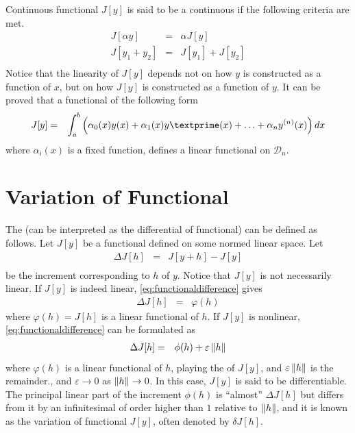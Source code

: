 Continuous functional $J[y]$ is said to be a continuous  if the following criteria are met.
\begin{eqnarray}
  J[\alpha y] &=& \alpha J[y] \nonumber \\
  J[y_1 + y_2] &=& J[y_1] + J[y_2] \nonumber \\
\end{eqnarray}
Notice that the linearity of $J[y]$ depends not on how $y$ is constructed as a function of $x$, but on how $J[y]$ is constructed as a function of $y$. It can be proved that a functional of the following form
\begin{eqnarray}
  J[y] &=& \int_{a}^{b}\left(\alpha_0(x)y(x) + \alpha_1(x)y\textprime(x) + \ldots + \alpha_n y^{(n)}(x)\right)dx
\end{eqnarray}
where $\alpha_i(x)$ is a fixed function, defines a linear functional on $\mathcal{D}_n$. 
 
\section{Variation of Functional}

The  (can be interpreted as the differential of functional) can be defined as follows. Let $J[y]$ be a functional defined on some normed linear space. Let
\begin{eqnarray}
\Delta J[h] &=& J[y + h] - J[y] \label{eq:functionaldifference} \\
\end{eqnarray}
be the increment corresponding to $h$ of $y$. Notice that $J[y]$ is not necessarily linear. If $J[y]$ is indeed linear, \eqref{eq:functionaldifference} gives
\begin{eqnarray}
  \Delta J[h] &=& \varphi(h) \nonumber
\end{eqnarray}
where $\varphi(h) = J[h]$ is a linear functional of $h$. If $J[y]$ is nonlinear, \eqref{eq:functionaldifference} can be formulated as
\begin{eqnarray}
  \Delta J[h] &=& \phi(h) + \varepsilon \left\lVert h\right\rVert \nonumber
\end{eqnarray}
where $\varphi(h)$ is a linear functional of $h$, playing the  of $J[y]$, and $\varepsilon \left\lVert h\right\rVert$ is the remainder., and $\varepsilon \rightarrow 0$ as $\left\lVert h\right\rVert \rightarrow 0$. In this case, $J[y]$ is said to be differentiable. The principal linear part of the increment $\phi(h)$ is ``almost'' $\Delta J[h]$ but differs from it by an infinitesimal of order higher than $1$ relative to $\left\lVert h\right\rVert$, and it is known as the variation of functional $J[y]$, often denoted by $\delta J[h]$.





 


